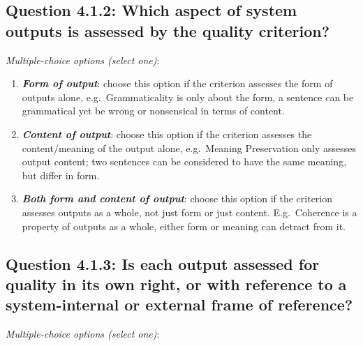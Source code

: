 \documentclass[11pt,a4paper]{article}
\newcommand{\egcvalue}[1]{\textbf{\textit{#1}}}
\begin{document}
\subsection*{Question 4.1.2:  Which aspect of system outputs is assessed by the quality criterion?}
\vspace{-.1cm}

\vspace{.3cm}
\noindent\textit{Multiple-choice options (select one)}:  
\vspace{-.1cm}

\begin{enumerate}[itemsep=0cm,leftmargin=0.5cm,label={\LARGE $\circ$}]
    \item \egcvalue{Form of output}: choose this option if the criterion assesses the form of outputs alone, e.g.\ Grammaticality is only about the form, a sentence can be grammatical yet be wrong or nonsensical in terms of content.
    \item \egcvalue{Content of output}: choose this option if the criterion assesses the content/meaning of the output alone, e.g.\ Meaning Preservation only assesses output content; two sentences can be considered to have the same meaning, but differ in form.
    \item \egcvalue{Both form and content of output}: choose this option if the criterion assesses outputs as a whole, not just form or just content. E.g.\ Coherence is a property of outputs as a whole, either form or meaning can detract from it.
\end{enumerate}


\subsection*{Question 4.1.3: Is each output assessed for quality in its own right, or with reference to a system-internal or external frame of reference?}

\noindent\textit{Multiple-choice options (select one)}:  
\vspace{-.1cm}
\end{document}
